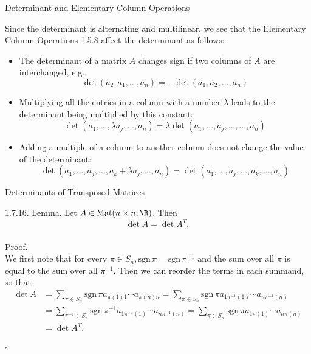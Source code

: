 \documentclass[smaller,hyperref={CJKbookmarks=true}]{beamer}
\begin{document}
\begin{frame}[t]{Determinant and Elementary Column Operations}
\begin{spacing}{1.05}
Since the determinant is alternating and multilinear, we see that the
Elementary Column Operations 1.5.8 af{}fect the determinant as follows:
\begin{itemize}
  \item The determinant of a matrix $A$ changes sign if two columns of $A$ are interchanged, e.g.,
      \[\det(a_2,a_1,\ldots,a_n)=-\det(a_1,a_2,\ldots,a_n)\]
  \item Multiplying all the entries in a column with a number $\lambda$ leads to the determinant being multiplied by this constant:
      \[\det(a_1,\ldots,\lambda a_j,\ldots,a_n)=\lambda\det(a_1,\ldots,a_j,\ldots,\ldots,a_n)\]
  \item Adding a multiple of a column to another column does not change the value of the determinant:
      \[\det(a_1,\ldots,a_j,\ldots,a_k+\lambda a_j,\ldots,a_n)=\det(a_1,\ldots,a_j,\ldots,a_k,\ldots,a_n)\]
\end{itemize}
\end{spacing}
\end{frame}
\begin{frame}[t]{Determinants of Transposed Matrices}
\begin{spacing}{1.05}
\alert{1.7.16. Lemma.} Let $A\in\text{Mat}(n\times n;\R)$. Then
\[\det A=\det A^T,\]
 \\[9pt]
\alert{Proof.}\\
We first note that for every $\pi\in S_n,\text{sgn}\,\pi=\text{sgn}\,\pi^{-1}$ and the sum over all $\pi$ is equal to the sum over all $\pi^{-1}$. Then we can reorder the terms in each summand, so that
\begin{equation*}
  \begin{split}
     \det A &=\sum_{\pi\in S_n}\text{sgn}\,\pi a_{\pi(1)1}\cdots a_{\pi(n)n}=\sum_{\pi\in S_n}\text{sgn}\,\pi a_{1\pi^{-1}(1)}\cdots a_{n\pi^{-1}(n)} \\
       &=\sum_{\pi^{-1}\in S_n}\text{sgn}\,\pi^{-1}a_{1\pi^{-1}(1)}\cdots a_{n\pi^{-1}(n)}=\sum_{\pi\in S_n}\text{sgn}\,\pi a_{1\pi(1)}\cdots a_{n\pi(n)}  \\
       &=\det A^T.
  \end{split}
\end{equation*}
\begin{flushright}
  $\square$
\end{flushright}
\end{spacing}
\end{frame}
\end{document}
